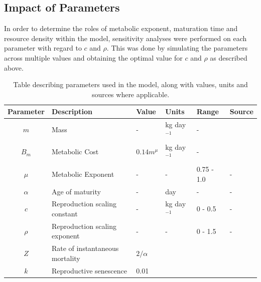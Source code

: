 \documentclass[a4paper, 11pt, hidelinks]{article} %
\begin{document}
	\subsection{Impact of Parameters}

	In order to determine the roles of metabolic exponent, maturation time and resource density within the model, sensitivity analyses were performed on each parameter with regard to $c$ and $\rho$.  This was done by simulating the parameters across multiple values and obtaining the optimal value for $c$ and $\rho$ as described above.
	
	
	\begin{centering}
		
		
		\begin{table}[h!]
			\caption{Table describing parameters used in the model, along with values, units and sources where applicable.} 
			\label{parameters}
			\begin{tabular}{c l l l l p{3cm}}
				\hline
				Parameter 	& Description 			& Value 	& Units 	& Range 		& Source \\
				\hline
				$m$			& Mass					& -			& kg day$^{-1}$& -			&		\\
				
				$B_m$		& Metabolic Cost		& $0.14 m^{\mu}$ & kg day$^{-1}$& - 	& \cite{Peters1983}\\
				$\mu$		& Metabolic Exponent	& -			&	-		& 0.75 - 1.0	& - \\
				$\alpha$	& Age of maturity		& -     	& day		& -				& -\\
				$c$			& Reproduction scaling constant & - & kg day$^{-1}$& 0 - 0.5 		& -\\
				$\rho$		& Reproduction scaling exponent	& -	&	-		& 0 - 1.5			& -\\
				$Z$			& Rate of instantaneous mortality& $2/\alpha$	& & & \cite{Charnov2001}\\%
				$k$			& Reproductive senescence & 0.01\\
				

\end{tabular}
\end{table}
\end{centering}
\end{document}
